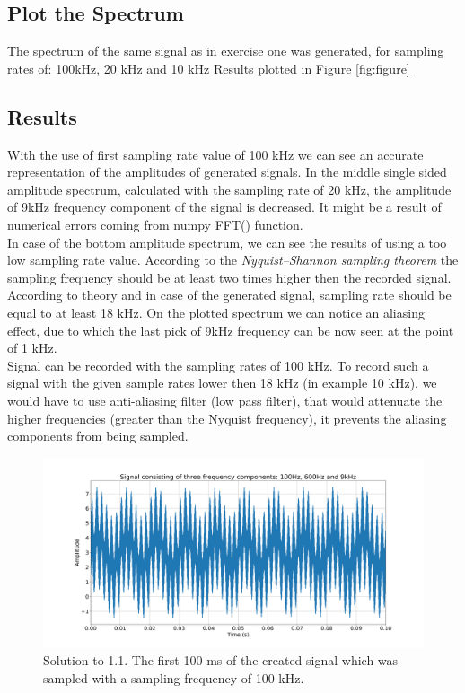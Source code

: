 \documentclass{scrartcl}			%
\begin{document}
\subsection{Plot the Spectrum}
The spectrum of the same signal as in exercise one was generated, for sampling rates of: 100kHz, 20 kHz and 10 kHz  Results plotted in Figure \ref{fig:figure}




\subsection{Results}
With the use of first sampling rate value of 100 kHz we can see an accurate representation of the amplitudes of generated signals. In the middle single sided amplitude spectrum, calculated with the sampling rate of 20 kHz, the amplitude of 9kHz frequency component of the signal is decreased. It might be a result of numerical errors coming from numpy FFT() function.\\

In case of the bottom amplitude spectrum, we can see the results of using a too low sampling rate value. According to the \textit{Nyquist–Shannon sampling theorem} the sampling frequency should be at least two times higher then the recorded signal. According to theory and in case of the generated signal, sampling rate should be equal to at least 18 kHz. On the plotted spectrum we can notice an aliasing effect, due to which the last pick of 9kHz frequency can be now seen at the point of 1 kHz.\\

Signal can be recorded with the sampling rates of 100 kHz. To record such a signal with the given sample rates lower then 18 kHz (in example 10 kHz), we would have to use anti-aliasing filter (low pass filter), that would attenuate the higher frequencies (greater than the Nyquist frequency), it prevents the aliasing components from being sampled.


\begin{figure}[hbpt!]					%
	\centering
	\includegraphics[scale=0.3]{1.png}
	\captionsetup{width=\linewidth}  %
	\caption{Solution to 1.1. The first 100 ms of the created signal which was sampled with a sampling-frequency of 100 kHz.}
	\label{subsec_fig} %
\end{figure}
\end{document}
